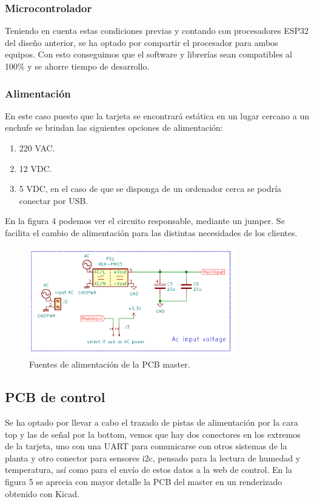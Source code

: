 \documentclass[paper=a4, fontsize=11pt,twoside]{scrartcl}	%
\begin{document}
        \subsubsection{Microcontrolador} 
            Teniendo en cuenta estas condiciones previas y contando con procesadores ESP32 del diseño anterior, se ha optado por compartir 
            el procesador para ambos equipos. Con esto conseguimos que el software y librerías sean compatibles al 100\% y se ahorre tiempo
            de desarrollo.
        \subsubsection{Alimentación} 
            En este caso puesto que la tarjeta se encontrará estática en un lugar cercano a un enchufe se brindan las siguientes opciones
            de alimentación:
            \begin{enumerate}
                \item 220 VAC.
                \item 12 VDC.
                \item 5 VDC, en el caso de que se disponga de un ordenador cerca se podría conectar por USB.
            \end{enumerate}
            En la figura 4 podemos ver el circuito responsable, mediante un jumper. Se facilita el cambio de alimentación para las distintas necesidades 
            de los clientes.
            \begin{center}
                \begin{figure}[h]
                    \centering
                    \includegraphics[width=0.8\textwidth]{../receiver_main_power.PNG}
                    \caption{Fuentes de alimentación de la PCB master.}
                    \label{fig:mesh4}
                \end{figure}    
            \end{center}    
    \subsection{PCB de control}
        Se ha optado por llevar a cabo el trazado de pistas de alimentación por la cara top y las de señal por la bottom, vemos que hay dos 
        conectores en los extremos de la tarjeta, uno con una UART para comunicarse con otros sistemas de la planta y otro conector para sensores
        i2c, pensado para la lectura de humedad y temperatura, así como para el envío de estos datos a la web de control. En la figura 5 se aprecia 
        con mayor detalle la PCB del master en un renderizado obtenido con Kicad.
\end{document}
